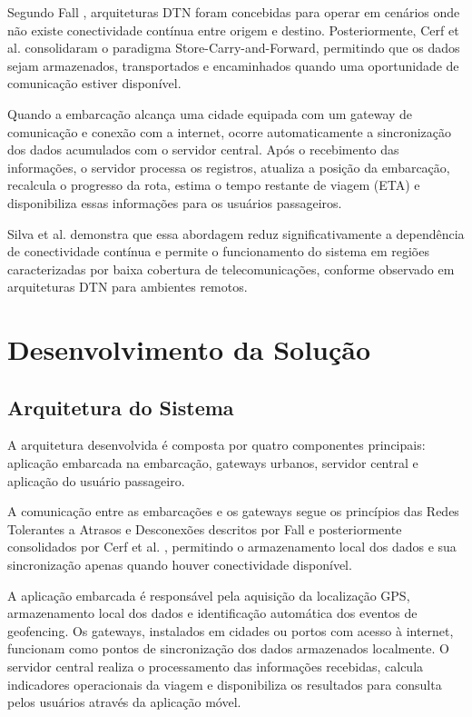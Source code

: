 \documentclass[12pt]{article}
\begin{document}
Segundo Fall \cite{fall2003dtn}, arquiteturas DTN foram concebidas para operar em cenários onde não existe conectividade contínua entre origem e destino. Posteriormente, Cerf et al. \cite{cerf2007rfc4838} consolidaram o paradigma Store-Carry-and-Forward, permitindo que os dados sejam armazenados, transportados e encaminhados quando uma oportunidade de comunicação estiver disponível.

Quando a embarcação alcança uma cidade equipada com um gateway de comunicação e conexão com a internet, ocorre automaticamente a sincronização dos dados acumulados com o servidor central. Após o recebimento das informações, o servidor processa os registros, atualiza a posição da embarcação, recalcula o progresso da rota, estima o tempo restante de viagem (ETA) e disponibiliza essas informações para os usuários passageiros.

Silva et al. \cite{floatingblue2024} demonstra que essa abordagem reduz significativamente a dependência de conectividade contínua e permite o funcionamento do sistema em regiões caracterizadas por baixa cobertura de telecomunicações, conforme observado em arquiteturas DTN para ambientes remotos.

\section{Desenvolvimento da Solução}
\subsection{Arquitetura do Sistema}
A arquitetura desenvolvida é composta por quatro componentes principais: aplicação embarcada na embarcação, gateways urbanos, servidor central e aplicação do usuário passageiro.

A comunicação entre as embarcações e os gateways segue os princípios das Redes Tolerantes a Atrasos e Desconexões descritos por Fall \cite{fall2003dtn} e posteriormente consolidados por Cerf et al. \cite{cerf2007rfc4838}, permitindo o armazenamento local dos dados e sua sincronização apenas quando houver conectividade disponível.

A aplicação embarcada é responsável pela aquisição da localização GPS, armazenamento local dos dados e identificação automática dos eventos de geofencing. Os gateways, instalados em cidades ou portos com acesso à internet, funcionam como pontos de sincronização dos dados armazenados localmente. O servidor central realiza o processamento das informações recebidas, calcula indicadores operacionais da viagem e disponibiliza os resultados para consulta pelos usuários através da aplicação móvel.
\end{document}
